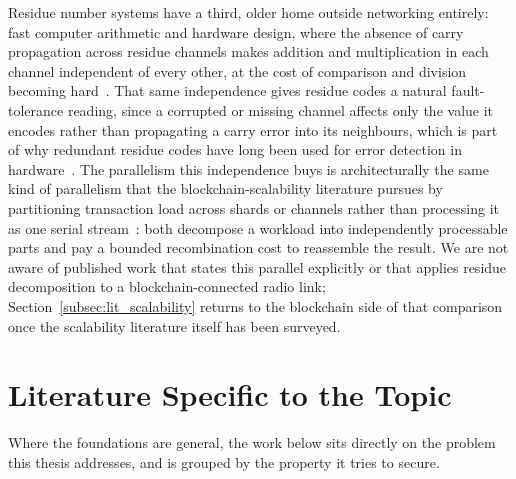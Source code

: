 Residue number systems have a third, older home outside networking
entirely: fast computer arithmetic and hardware design, where the absence
of carry propagation across residue channels makes addition and
multiplication in each channel independent of every other, at the cost of
comparison and division becoming hard~\cite{ding1996remainder,
parhami2010computer}. That same independence gives residue codes a natural
fault-tolerance reading, since a corrupted or missing channel affects only
the value it encodes rather than propagating a carry error into its
neighbours, which is part of why redundant residue codes have long been
used for error detection in
hardware~\cite{knuth1997art, hardy2008introduction}. The parallelism this
independence buys is architecturally the same kind of parallelism that the
blockchain-scalability literature pursues by partitioning transaction load
across shards or channels rather than processing it as one serial
stream~\cite{horvath2025assistedsharding, anonndoptimizedcloud}: both
decompose a workload into independently processable parts and pay a
bounded recombination cost to reassemble the result. We are not aware of
published work that states this parallel explicitly or that applies
residue decomposition to a blockchain-connected radio link;
Section~\ref{subsec:lit_scalability} returns to the blockchain side of
that comparison once the scalability literature itself has been surveyed.

\section{Literature Specific to the Topic}
\label{sec:lit_specific_topic}

Where the foundations are general, the work below sits directly on the
problem this thesis addresses, and is grouped by the property it tries to
secure.

\label{subsec:lit_blockchain_ag}

